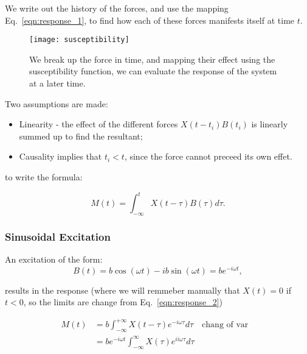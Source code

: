 \noindent  We  write  out  the  history  of  the  forces,  and  use  the  mapping
Eq.~\eqref{eqn:response_1}, to find how each  of these forces manifests itself at
time $ t $.

\begin{figure}[h]
  \centering \texttt{[image: susceptibility]}
  \caption{\small We break  up the force in time, and  mapping their effect using
    the susceptibility function, we can evaluate  the response of the system at a
    later time.}
\end{figure}

Two assumptions are made:
\begin{itemize}
\item  Linearity -  the effect  of  the different  forces $  X(t-t_i)B(t_i) $  is
  linearly summed up to find the resultant;
\item Causality implies that $ t_i < t  $, since the force cannot preceed its own
  effet.
\end{itemize}

\noindent to write the formula:

\begin{framed}\noindent
  \begin{equation}\label{eqn:response_2}
    M(t) = \int_{-\infty}^{t}X(t - \tau)B(\tau)d\tau.
  \end{equation}
\end{framed}

 \subsubsection{Sinusoidal Excitation}
 An excitation of the form:
 \begin{equation}
   B(t) = b\cos(\omega t) - ib\sin(\omega t) = be^{-i\omega t},
 \end{equation}

 \noindent  results  in  the  response  (where we  will  remmeber  manually  that
 $   X(t)   =   0  $   if   $   t<0   $,   so   the  limits   are   change   from
 Eq.~\eqref{eqn:response_2})

 \begin{equation}
   \begin{aligned}
     M(t) &= b\int_{-\infty}^{+\infty}X(t - \tau)e^{-i\omega \tau}d\tau\quad\text{chang of var}&\\
     & = be^{-i\omega t}\int_{-\infty}^{\infty}X(\tau)e^{ii\omega\tau}d\tau&\\
   \end{aligned}
 \end{equation}

